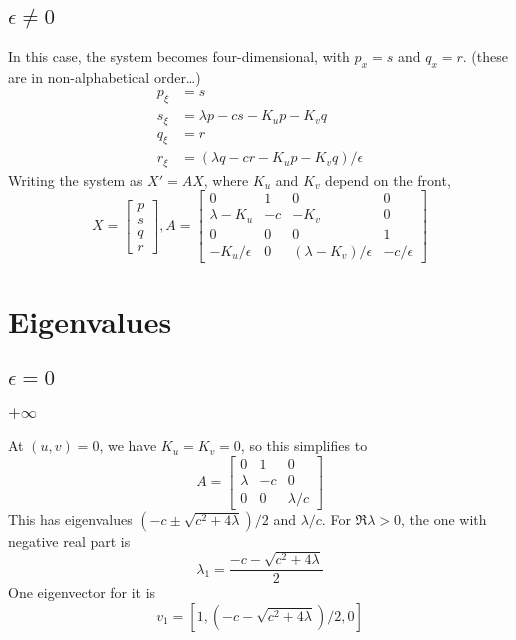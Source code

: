 \documentclass[10pt]{article}
\begin{document}
\subsection{$\epsilon \neq 0$}
In this case, the system becomes four-dimensional, with $p_x = s$ and $q_x = r$.
(these are in non-alphabetical order\ldots)
\begin{align}
p_\xi &= s \\
s_\xi &= \lambda p - c s - K_u p - K_v q \\
q_\xi &= r \\
r_\xi &= (\lambda q - c r - K_u p - K_v q)/\epsilon
\end{align}
Writing the system as $X' = AX$, where $K_u$ and $K_v$ depend on the front,
\[
X = \begin{bmatrix}p\\s\\q\\r\end{bmatrix},
A = \begin{bmatrix}
0 & 1 & 0 & 0 \\
\lambda - K_u  &  -c  &  -K_v  & 0 \\
0 & 0 & 0 & 1 \\
- K_u/\epsilon &  0  &  (\lambda - K_v)/\epsilon  &  - c / \epsilon
\end{bmatrix}
\]



\section{Eigenvalues}
\subsection{$\epsilon = 0$}
\subsubsection{$+\infty$}
At $(u,v) = 0$, we have $K_u = K_v = 0$, so this simplifies to
\[
A = \begin{bmatrix}
0 & 1 & 0 \\
\lambda &  -c  &  0 \\
0 &  0  &  \lambda/c
\end{bmatrix}
\]
This has eigenvalues $(-c \pm \sqrt{c^2 + 4 \lambda})/2$ and $\lambda/c$.  For $\Re \lambda > 0$, the one with negative real part is
\[\lambda_1 = \frac{-c - \sqrt{c^2 + 4 \lambda}}{2}\]
One eigenvector for it is
\[v_1 = [1,(-c - \sqrt{c^2 + 4 \lambda})/2,0] \]
\end{document}
